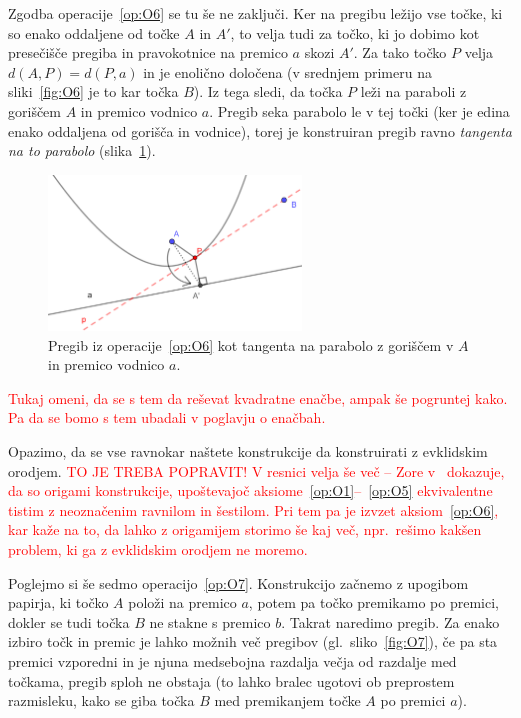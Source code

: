 Zgodba operacije~\ref{op:O6} se tu še ne zaključi. Ker na pregibu ležijo vse točke, ki so enako oddaljene od točke $A$ in $A'$, to velja tudi za točko, ki jo dobimo kot presečišče pregiba in pravokotnice na premico $a$ skozi $A'$. Za tako točko $P$ velja $ d(A,P) = d(P,a) $ in je enolično določena (v srednjem primeru na sliki~\ref{fig:O6} je to kar točka $B$). Iz tega sledi, da točka $P$ leži na paraboli z goriščem $A$ in premico vodnico $a$. Pregib seka parabolo le v tej točki (ker je edina enako oddaljena od gorišča in vodnice), torej je konstruiran pregib ravno \emph{tangenta na to parabolo} (slika~\ref{fig:O6_parabola}).

\begin{figure}[h]
    \centering
    \includegraphics[width=0.6\textwidth]{images/origami_operacije/O6_parabola.png}
    \caption[Tangenta na parabolo]{Pregib iz operacije~\ref{op:O6} kot tangenta na parabolo z goriščem v $A$ in premico vodnico $a$.}
    \label{fig:O6_parabola}
\end{figure}

\textcolor{red}{Tukaj omeni, da se s tem da reševat kvadratne enačbe, ampak še pogruntej kako. Pa da se bomo s tem ubadali v poglavju o enačbah.}

Opazimo, da se vse ravnokar naštete konstrukcije da konstruirati z evklidskim orodjem. \textcolor{red}{TO JE TREBA POPRAVIT! V resnici velja še več -- Zore v~\cite{zore2022} dokazuje, da so origami konstrukcije, upoštevajoč aksiome~\ref{op:O1}--~\ref{op:O5} ekvivalentne tistim z neoznačenim ravnilom in šestilom. Pri tem pa je izvzet aksiom~\ref{op:O6}, kar kaže na to, da lahko z origamijem storimo še kaj več, npr.\ rešimo kakšen problem, ki ga z evklidskim orodjem ne moremo.}

Poglejmo si še sedmo operacijo~\ref{op:O7}. Konstrukcijo začnemo z upogibom papirja, ki točko $A$ položi na premico $a$, potem pa točko premikamo po premici, dokler se tudi točka $B$ ne stakne s premico $b$. Takrat naredimo pregib. Za enako izbiro točk in premic je lahko možnih več pregibov (gl.\ sliko~\ref{fig:O7}), če pa sta premici vzporedni in je njuna medsebojna razdalja večja od razdalje med točkama, pregib sploh ne obstaja (to lahko bralec ugotovi ob preprostem razmisleku, kako se giba točka $B$ med premikanjem točke $A$ po premici $a$).


